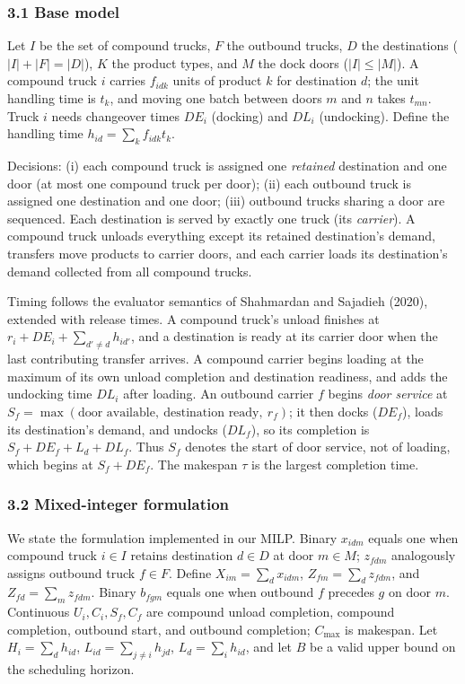 \documentclass[
]{article}
\begin{document}
\subsubsection{3.1 Base model}\label{base-model}

Let \(I\) be the set of compound trucks, \(F\) the outbound trucks,
\(D\) the destinations (\(|I|+|F|=|D|\)), \(K\) the product types, and
\(M\) the dock doors (\(|I|\le |M|\)). A compound truck \(i\) carries
\(f_{idk}\) units of product \(k\) for destination \(d\); the unit
handling time is \(t_k\), and moving one batch between doors \(m\) and
\(n\) takes \(t_{mn}\). Truck \(i\) needs changeover times \(DE_i\)
(docking) and \(DL_i\) (undocking). Define the handling time
\(h_{id}=\sum_k f_{idk}t_k\).

Decisions: (i) each compound truck is assigned one \emph{retained}
destination and one door (at most one compound truck per door); (ii)
each outbound truck is assigned one destination and one door; (iii)
outbound trucks sharing a door are sequenced. Each destination is served
by exactly one truck (its \emph{carrier}). A compound truck unloads
everything except its retained destination's demand, transfers move
products to carrier doors, and each carrier loads its destination's
demand collected from all compound trucks.

Timing follows the evaluator semantics of Shahmardan and Sajadieh
(2020), extended with release times. A compound truck's unload finishes
at \(r_i+DE_i+\sum_{d'\ne d}h_{id'}\), and a destination is ready at its
carrier door when the last contributing transfer arrives. A compound
carrier begins loading at the maximum of its own unload completion and
destination readiness, and adds the undocking time \(DL_i\) after
loading. An outbound carrier \(f\) begins \emph{door service} at
\(S_f=\max(\text{door available},\ \text{destination ready},\ r_f)\); it
then docks (\(DE_f\)), loads its destination's demand, and undocks
(\(DL_f\)), so its completion is \(S_f+DE_f+L_d+DL_f\). Thus \(S_f\)
denotes the start of door service, not of loading, which begins at
\(S_f+DE_f\). The makespan \(\tau\) is the largest completion time.

\subsubsection{3.2 Mixed-integer
formulation}\label{mixed-integer-formulation}

We state the formulation implemented in our MILP. Binary \(x_{idm}\)
equals one when compound truck \(i\in I\) retains destination \(d\in D\)
at door \(m\in M\); \(z_{fdm}\) analogously assigns outbound truck
\(f\in F\). Define \(X_{im}=\sum_d x_{idm}\), \(Z_{fm}=\sum_d z_{fdm}\),
and \(Z_{fd}=\sum_m z_{fdm}\). Binary \(b_{fgm}\) equals one when
outbound \(f\) precedes \(g\) on door \(m\). Continuous
\(U_i,C_i,S_f,C_f\) are compound unload completion, compound completion,
outbound start, and outbound completion; \(C_{\max}\) is makespan. Let
\(H_i=\sum_d h_{id}\), \(L_{id}=\sum_{j\ne i}h_{jd}\),
\(L_d=\sum_i h_{id}\), and let \(B\) be a valid upper bound on the
scheduling horizon.
\end{document}
